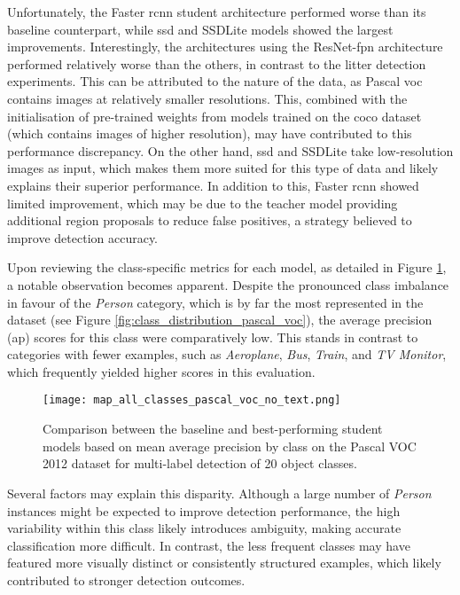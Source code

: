 Unfortunately, the Faster \gls{rcnn} student architecture performed worse than its baseline counterpart, while \gls{ssd} and SSDLite models showed the largest improvements. Interestingly, the architectures using the ResNet-\gls{fpn} architecture performed relatively worse than the others, in contrast to the litter detection experiments. This can be attributed to the nature of the data, as Pascal \gls{voc} contains images at relatively smaller resolutions. This, combined with the initialisation of pre-trained weights from models trained on the \gls{coco} dataset (which contains images of higher resolution), may have contributed to this performance discrepancy. On the other hand, \gls{ssd} and SSDLite take low-resolution images as input, which makes them more suited for this type of data and likely explains their superior performance. In addition to this, Faster \gls{rcnn} showed limited improvement, which may be due to the teacher model providing additional region proposals to reduce false positives, a strategy believed to improve detection accuracy.

Upon reviewing the class-specific metrics for each model, as detailed in Figure \ref{fig:pascal_voc_per_class}, a notable observation becomes apparent.
 Despite the pronounced class imbalance in favour of the \textit{Person} category, which is by far the most represented in the dataset (see Figure \ref{fig:class_distribution_pascal_voc}), the average precision (\gls{ap}) scores for this class were comparatively low. This stands in contrast to categories with fewer examples, such as \textit{Aeroplane}, \textit{Bus}, \textit{Train}, and \textit{TV Monitor}, which frequently yielded higher scores in this evaluation.

\begin{figure}[!htbp]
    \centering
    \texttt{[image: map\_all\_classes\_pascal\_voc\_no\_text.png]}
    \caption{Comparison between the baseline and best-performing student models based on mean average precision by class on the Pascal VOC 2012 dataset for multi-label detection of 20 object classes.}
    \label{fig:pascal_voc_per_class}
\end{figure}

Several factors may explain this disparity. Although a large number of \textit{Person} instances might be expected to improve detection performance, the high variability within this class likely introduces ambiguity, making accurate classification more difficult. In contrast, the less frequent classes may have featured more visually distinct or consistently structured examples, which likely contributed to stronger detection outcomes.

